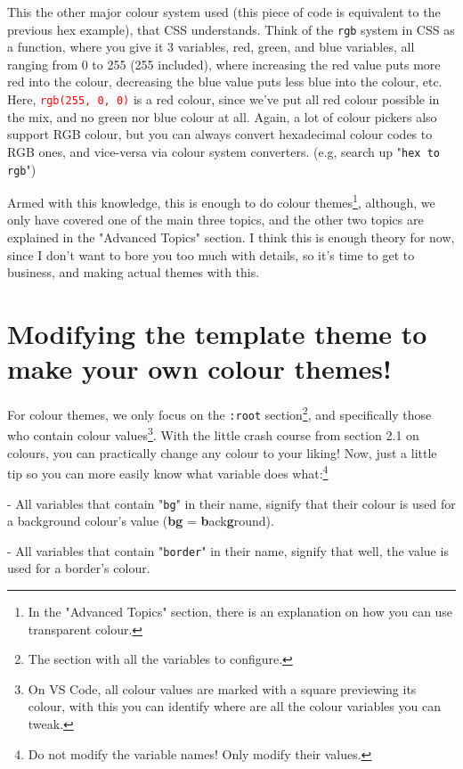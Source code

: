 \documentclass{article}
\begin{document}
This the other major colour system used (this piece of code is equivalent to the previous hex example), that CSS understands. Think of the \texttt{rgb} system in CSS as a function, where you give it 3 variables, red, green, and blue variables, all ranging from 0 to 255 (255 included), where increasing the red value puts more red into the colour, decreasing the blue value puts less blue into the colour, etc. Here, \texttt{\textcolor{red}{rgb(255,\ 0,\ 0)}} is a red colour, since we've put all red colour possible in the mix, and no green nor blue colour at all. Again, a lot of colour pickers also support RGB colour, but you can always convert hexadecimal colour codes to RGB ones, and vice-versa via colour system converters. (e.g, search up "\texttt{hex to rgb}")
\clearpage

Armed with this knowledge, this is enough to do colour themes\footnote{In the "Advanced Topics" section, there is an explanation on how you can use transparent colour.}, although, we only have covered one of the main three topics, and the other two topics are explained in the "Advanced Topics" section. I think this is enough theory for now, since I don't want to bore you too much with details, so it's time to get to business, and making actual themes with this. 

\section{Modifying the template theme to make your own colour themes!}

For colour themes, we only focus on the \texttt{:root} section\footnote{The section with all the variables to configure.}, and specifically those who contain colour values\footnote{On VS Code, all colour values are marked with a square previewing its colour, with this you can identify where are all the colour variables you can tweak.}. With the little crash course from section 2.1 on colours, you can practically change any colour to your liking! Now, just a little tip so you can more easily know what variable does what:\footnote{Do not modify the variable names! Only modify their values.}

- All variables that contain "\texttt{bg}" in their name, signify that their colour is used for a background colour's value (\textbf{bg} = \textbf{b}ack\textbf{g}round).

- All variables that contain "\texttt{border}" in their name, signify that well, the value is used for a border's colour.
\end{document}
